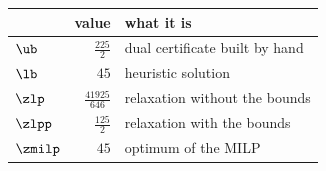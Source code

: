 \begin{center}\small
\begin{tabular}{lrl}
\toprule
 & value & what it is \\
\midrule
$\ub$ & $\frac{225}{2}$ & dual certificate built by hand \\
$\lb$ & $45$ & heuristic solution \\
$\zlp$ & $\frac{41925}{646}$ & relaxation without the bounds \\
$\zlpp$ & $\frac{125}{2}$ & relaxation with the bounds \\
$\zmilp$ & $45$ & optimum of the MILP \\
\bottomrule
\end{tabular}
\end{center}
